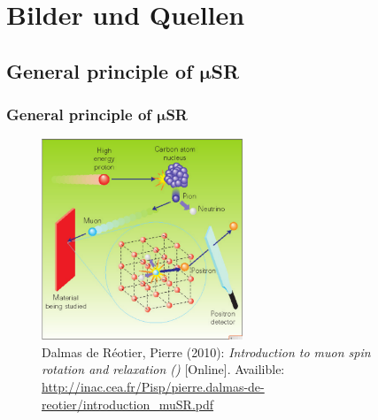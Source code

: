 \section{Bilder und Quellen}
\subsection{General principle of $\mathbf{\mu}$SR}
\begin{frame}[fragile]
	\frametitle{General principle of $\mathbf{\mu}$SR}
	\begin{figure}[!htb]
		\begin{center}
			\includegraphics[height=6cm, keepaspectratio]{Bilder/musr_general_principle.png}%
			\caption*{  \setlength{\baselineskip}{6pt}
				{\tiny Dalmas de Réotier, Pierre (2010): \textit{Introduction to muon spin rotation and relaxation (\musr)} [Online]. Availible: \url{http://inac.cea.fr/Pisp/pierre.dalmas-de-				reotier/introduction_muSR.pdf}}
			}%
		\end{center}
	\end{figure}          
\end{frame}






